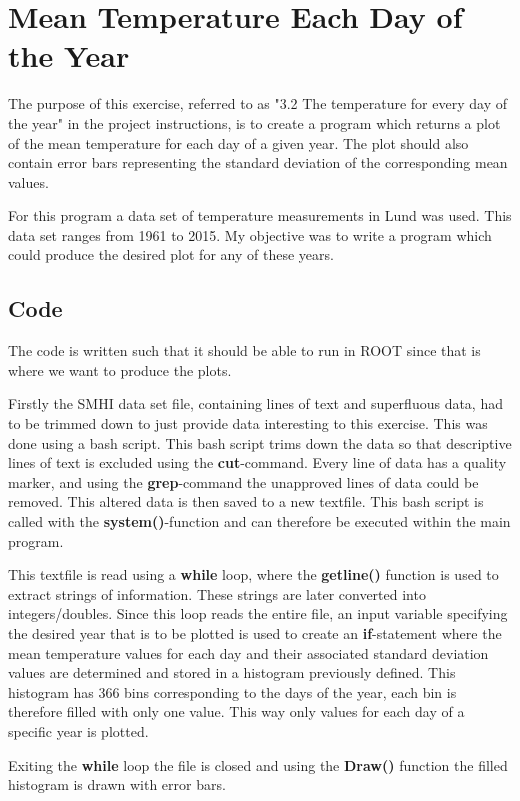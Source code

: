 \section{Mean Temperature Each Day of the Year}
The purpose of this exercise, referred to as "3.2 The temperature for every day of the year" in the project instructions, is to create a program which returns a plot of the mean temperature for each day of a given year. The plot should also contain error bars representing the standard deviation of the corresponding mean values.

For this program a data set of temperature measurements in Lund was used. This data set ranges from 1961 to 2015. My objective was to write a program which could produce the desired plot for any of these years.

\subsection{Code}
The code is written such that it should be able to run in ROOT since that is where we want to produce the plots.

Firstly the SMHI data set file, containing lines of text and superfluous data, had to be trimmed down to just provide data interesting to this exercise. This was done using a bash script. This bash script trims down the data so that descriptive lines of text is excluded using the \textbf{cut}-command. Every line of data has a quality marker, and using the \textbf{grep}-command the unapproved lines of data could be removed. This altered data is then saved to a new textfile. This bash script is called with the \textbf{system()}-function and can therefore be executed within the main program.

This textfile is read using a \textbf{while} loop, where the \textbf{getline()} function is used to extract strings of information. These strings are later converted into integers/doubles. Since this loop reads the entire file, an input variable specifying the desired year that is to be plotted is used to create an \textbf{if}-statement where the mean temperature values for each day and their associated standard deviation values are determined and stored in a histogram previously defined. This histogram has 366 bins corresponding to the days of the year, each bin is therefore filled with only one value. This way only values for each day of a specific year is plotted.

Exiting the \textbf{while} loop the file is closed and using the \textbf{Draw()} function the filled histogram is drawn with error bars.

